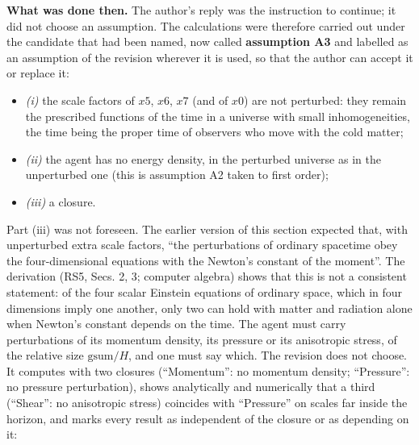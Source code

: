 \documentclass[
  10pt,
]{article}
\providecommand{\tightlist}{%
  \setlength{\itemsep}{0pt}\setlength{\parskip}{0pt}}
\begin{document}
\textbf{What was done then.} The author's reply was the instruction to
continue; it did not choose an assumption. The calculations were
therefore carried out under the candidate that had been named, now
called \textbf{assumption A3} and labelled as an assumption of the
revision wherever it is used, so that the author can accept it or
replace it:

\begin{itemize}
\tightlist
\item
  \emph{(i)} the scale factors of \(x5\), \(x6\), \(x7\) (and of \(x0\))
  are not perturbed: they remain the prescribed functions of the time in
  a universe with small inhomogeneities, the time being the proper time
  of observers who move with the cold matter;
\item
  \emph{(ii)} the agent has no energy density, in the perturbed universe
  as in the unperturbed one (this is assumption A2 taken to first
  order);
\item
  \emph{(iii)} a closure.
\end{itemize}

Part (iii) was not foreseen. The earlier version of this section
expected that, with unperturbed extra scale factors, ``the perturbations
of ordinary spacetime obey the four-dimensional equations with the
Newton's constant of the moment''. The derivation (RS5, Secs. 2, 3;
computer algebra) shows that this is not a consistent statement: of the
four scalar Einstein equations of ordinary space, which in four
dimensions imply one another, only two can hold with matter and
radiation alone when Newton's constant depends on the time. The agent
must carry perturbations of its momentum density, its pressure or its
anisotropic stress, of the relative size \(\mathrm{gsum}/H\), and one
must say which. The revision does not choose. It computes with two
closures (``Momentum'': no momentum density; ``Pressure'': no pressure
perturbation), shows analytically and numerically that a third
(``Shear'': no anisotropic stress) coincides with ``Pressure'' on scales
far inside the horizon, and marks every result as independent of the
closure or as depending on it:
\end{document}
